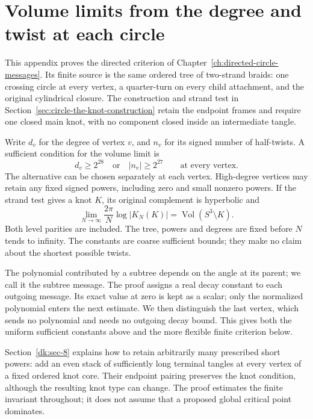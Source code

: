\chapter{Volume limits from the degree and twist at each circle}
\label{app:directed-circle-messages}\label{dk:volume-limits-from-the-degree-and-twist-at-each-circle}

This appendix proves the directed criterion of
Chapter~\ref{ch:directed-circle-messages}. Its finite source is the same
ordered tree of two-strand braids: one crossing circle at every vertex,
a quarter-turn on every child attachment, and the original
cylindrical closure. The
construction and strand test in
Section~\ref{sec:circle-the-knot-construction}
retain the endpoint frames and require one closed main knot, with no
component closed inside an intermediate tangle.

Write \(d_v\) for the degree of vertex \(v\), and \(n_v\) for its signed
number of half-twists. A sufficient condition for the volume limit is
\[
 \boxed{\qquad d_v\ge2^{28}\quad\text{or}\quad |n_v|\ge2^{27}
                       \qquad\text{at every vertex}.\qquad}
\]
The alternative can be chosen separately at each vertex. High-degree
vertices may retain any fixed signed powers, including zero and small
nonzero powers. If the strand test gives a knot \(K\), its original
complement is hyperbolic and
\[
 \lim_{N\to\infty}\frac{2\pi}{N}\log|K_N(K)|
                       =\operatorname{Vol}(S^3\setminus K).
\]
Both level parities are included. The tree, powers and degrees are fixed
before \(N\) tends to infinity. The constants are coarse sufficient
bounds; they make no claim about the shortest possible twists.

The polynomial contributed by a subtree depends on the angle at its
parent; we call it the subtree message. The proof assigns a real decay
constant to each outgoing message.
Its exact value at zero is kept as a scalar; only the normalized
polynomial enters the next estimate. We then distinguish the last
vertex, which sends no polynomial and needs no outgoing decay bound.
This gives both the uniform sufficient constants above and the more
flexible finite criterion below.

Section~\ref{dk:sec-8} explains how to retain arbitrarily many prescribed short
powers: add an even stack of sufficiently long terminal tangles at every
vertex of a fixed ordered knot core. Their endpoint pairing preserves
the knot condition, although the resulting knot type can change. The
proof estimates the finite invariant throughout; it does not
assume that a proposed global critical point dominates.

